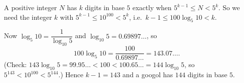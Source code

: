 A positive integer $N$ has $k$ digits in base $5$ exactly when $5^{k-1}\le N<5^k$. So we need the integer $k$ with $5^{k-1}\le10^{100}<5^k$, i.e.\ $k-1\le100\log_5 10<k$.

Now $\log_5 10=\dfrac{1}{\log_{10}5}$ and $\log_{10}5=0.69897\ldots$, so
\[
100\log_5 10=\dfrac{100}{0.69897\ldots}=143.07\ldots .
\]
(Check: $143\log_{10}5=99.95\ldots<100<100.65\ldots=144\log_{10}5$, so $5^{143}<10^{100}<5^{144}$.) Hence $k-1=143$ and a googol has $\boxed{144}$ digits in base $5$.

